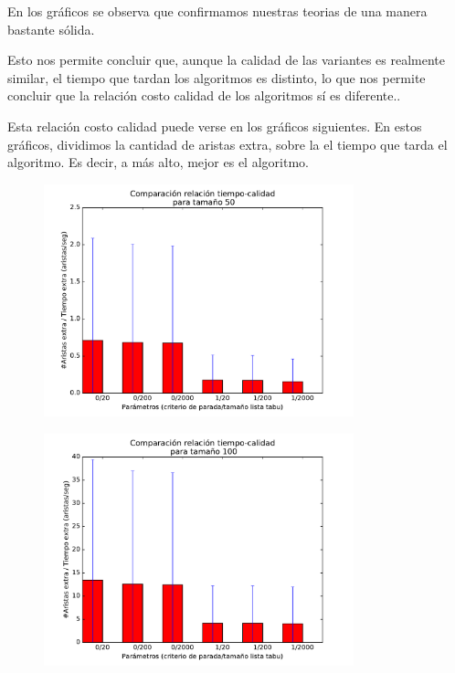 En los gráficos se observa que confirmamos nuestras teorias de una manera bastante sólida.

Esto nos permite concluir que, aunque la calidad de las variantes es realmente similar, el tiempo que tardan los algoritmos es distinto, lo que nos permite concluir que la relación costo calidad de los algoritmos sí es diferente..

Esta relación costo calidad puede verse en los gráficos siguientes. En estos gráficos, dividimos la cantidad de aristas extra, sobre la el tiempo que tarda el algoritmo. Es decir, a más alto, mejor es el algoritmo.




\begin{figure}[H]
 \centering
	\includegraphics[width=0.8\textwidth]{graficos/problema_6/cociente0.pdf}
	\caption{}
	\label{fig:problema6-cociente0}
\end{figure}

\begin{figure}[H]
 \centering
	\includegraphics[width=0.8\textwidth]{graficos/problema_6/cociente1.pdf}
	\caption{}
	\label{fig:problema6-cociente1}
\end{figure}

